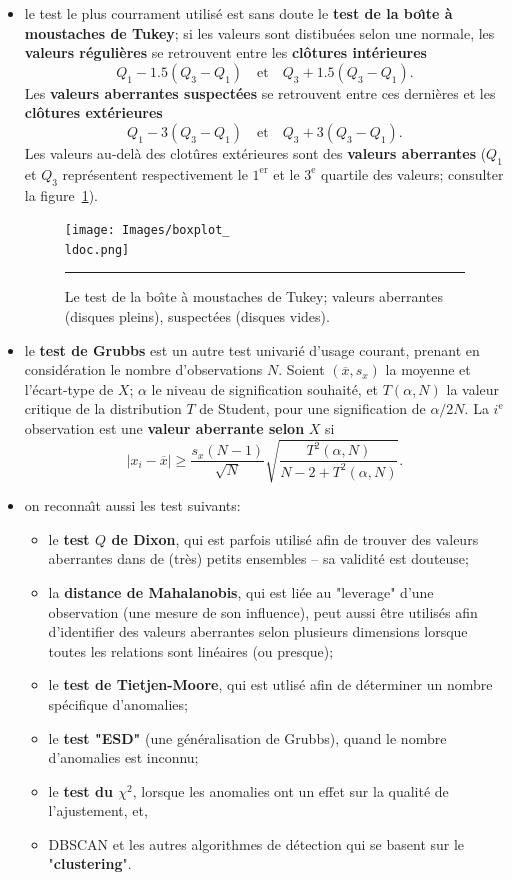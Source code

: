 \begin{itemize}[noitemsep]
\item le test le plus courrament utilis\'e est sans doute le  \textbf{test de la bo\^{\i}te \`a moustaches de Tukey}; si les valeurs sont distibu\'ees selon une normale, les \textbf{valeurs r\'e\-gu\-li\-\`eres} se retrouvent entre les \textbf{cl\^otures int\'erieures} $$Q_1-1.5(Q_3-Q_1) \quad\mbox{et}\quad Q_3+1.5(Q_3-Q_1).$$ Les \textbf{valeurs aberrantes suspect\'ees} se retrouvent entre ces derni\`eres et les \textbf{cl\^otures ext\'erieures} 
$$Q_1-3(Q_3-Q_1) \quad\mbox{et}\quad Q_3+3(Q_3-Q_1).$$
Les valeurs au-del\`a des clot\^ures ext\'erieures sont des \textbf{valeurs aberrantes} ($Q_1$ et $Q_3$ repr\'esentent respectivement le $1^{\textrm{er}}$ et le $3^{\textrm{e}}$ quartile des valeurs; consulter la figure~\ref{fig:boxplot}).
\begin{figure}[t]
\centering
\texttt{[image: Images/boxplot\_\\ldoc.png]}
\caption{\small Le test de la bo\^{\i}te \`a moustaches de Tukey; valeurs aberrantes (disques pleins), suspect\'ees (disques vides).}
\hrule\label{fig:boxplot}
\end{figure}
\afterpage{\FloatBarrier}
\item le \textbf{test de Grubbs} est un autre test univari\'e d'usage courant, prenant en consid\'eration le nombre d'ob\-ser\-va\-tions $N$. Soient  $(\overline{x},s_x)$ la moyenne et l'\'ecart-type de $X$; $\alpha$ le niveau de signification souhait\'e, et $T(\alpha,N)$ la valeur critique de la distribution $T$ de Student, pour une signification de $\alpha/2N$. La $i^{\textrm{e}}$ ob\-ser\-va\-tion est une \textbf{valeur aberrante selon} $X$ si $$|x_i-\overline{x}| \geq \frac{s_x(N-1)}{\sqrt{N}}\sqrt{\frac{T^2(\alpha,N)}{N-2+T^2(\alpha,N)}}.$$
\item on reconna\^{\i}t aussi les test suivants:
\begin{itemize}[noitemsep]
\item le \textbf{test $Q$ de Dixon}, qui est parfois utilisé afin de trouver des valeurs aberrantes dans de (tr\`es) petits ensembles -- sa validit\'e est douteuse;
\item la \textbf{distance de Mahalanobis}, qui est liée au "leverage" d'une ob\-ser\-va\-tion (une mesure de son influence), peut aussi être utilisés afin d'identifier des valeurs aberrantes selon plusieurs dimensions lorsque toutes les relations sont linéaires (ou presque);
\item le \textbf{test de Tietjen-Moore}, qui est utlis\'e afin de d\'eterminer un nombre sp\'ecifique d'anomalies;
\item le \textbf{test "ESD"} (une g\'en\'eralisation de Grubbs), quand le nombre d'anomalies est inconnu;
\item le \textbf{test du $\chi^2$}, lorsque les anomalies ont un effet sur la qualit\'e de l'ajustement, et,   
\item DBSCAN et les autres algorithmes de d\'etection qui se basent sur le "\textbf{clustering}". 
\end{itemize}
\end{itemize}
